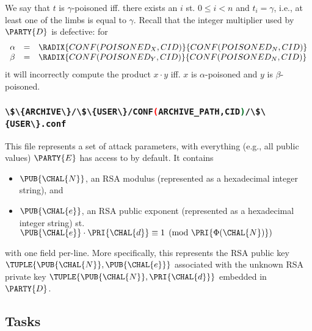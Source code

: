 \documentclass[crop={false},multi={true},tikz={true}]{standalone}
\begin{document}
\begin{itemize}
\[      \]
      We say that $t$ is $\gamma$-poisoned iff. there exists an $i$ st.
      $0 \leq i < n$ and $t_i = \gamma$, i.e., at least one of the limbs 
      is equal to $\gamma$.  Recall that the integer multiplier used by
      $\PARTY{D}$ is defective: for
      \[
      \begin{array}{lcl}
      \alpha &=& \RADIX{CONF(POISONED_X,CID)}{CONF(POISONED_N,CID)} \\
      \beta  &=& \RADIX{CONF(POISONED_Y,CID)}{CONF(POISONED_N,CID)} \\
      \end{array}
      \]
      it will incorrectly compute the product $x \cdot y$ iff. $x$ is 
      $\alpha$-poisoned and $y$ is $\beta$-poisoned.
\end{itemize}

\subsubsection{\lstinline[language={bash}]|\$\{ARCHIVE\}/\$\{USER\}/CONF(ARCHIVE_PATH,CID)/\$\{USER\}.conf|}

This file represents a set of attack parameters, with everything (e.g.,
all public values) $\PARTY{E}$ has access to by default.  It contains 

\begin{itemize}
\item $\PUB{\CHAL{N}}$,
      an RSA modulus
      (represented as a  hexadecimal integer string),      
      and
\item $\PUB{\CHAL{e}}$,
      an RSA public exponent
      (represented as a  hexadecimal integer string)
      st. $\PUB{\CHAL{e}} \cdot \PRI{\CHAL{d}} \equiv 1 \pmod{\PRI{\Phi(\CHAL{N})}}$
\end{itemize}

\noindent
with one field per-line.
More specifically, this represents the RSA public key 
$
\TUPLE{ \PUB{\CHAL{N}}, \PUB{\CHAL{e}} }
$
associated with the unknown RSA private key 
$
\TUPLE{ \PUB{\CHAL{N}}, \PRI{\CHAL{d}} }
$
embedded in $\PARTY{D}$.

\subsection{Tasks}
\end{document}
